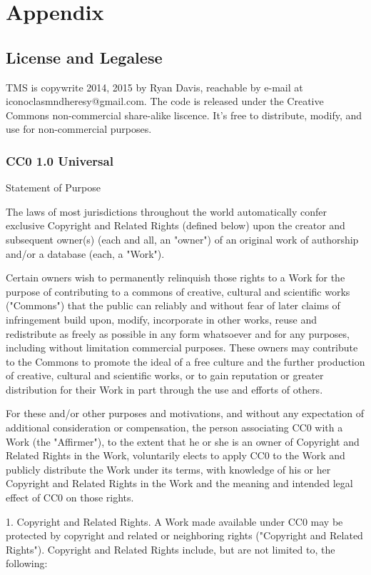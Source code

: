 \documentclass[10pt,letterpaper,twoside]{book}
\begin{document}
\part{Appendix}
\chapter{License and Legalese}
TMS is copywrite 2014, 2015 by Ryan Davis, reachable by e-mail at iconoclasmndheresy@gmail.com.
The code is released under the Creative Commons non-commercial share-alike liscence. It's free to distribute, modify, and use for non-commercial purposes.


\section{CC0 1.0 Universal}

Statement of Purpose

The laws of most jurisdictions throughout the world automatically confer
exclusive Copyright and Related Rights (defined below) upon the creator and
subsequent owner(s) (each and all, an "owner") of an original work of
authorship and/or a database (each, a "Work").

Certain owners wish to permanently relinquish those rights to a Work for the
purpose of contributing to a commons of creative, cultural and scientific
works ("Commons") that the public can reliably and without fear of later
claims of infringement build upon, modify, incorporate in other works, reuse
and redistribute as freely as possible in any form whatsoever and for any
purposes, including without limitation commercial purposes. These owners may
contribute to the Commons to promote the ideal of a free culture and the
further production of creative, cultural and scientific works, or to gain
reputation or greater distribution for their Work in part through the use and
efforts of others.

For these and/or other purposes and motivations, and without any expectation
of additional consideration or compensation, the person associating CC0 with a
Work (the "Affirmer"), to the extent that he or she is an owner of Copyright
and Related Rights in the Work, voluntarily elects to apply CC0 to the Work
and publicly distribute the Work under its terms, with knowledge of his or her
Copyright and Related Rights in the Work and the meaning and intended legal
effect of CC0 on those rights.

1. Copyright and Related Rights. A Work made available under CC0 may be
protected by copyright and related or neighboring rights ("Copyright and
Related Rights"). Copyright and Related Rights include, but are not limited
to, the following:
\end{document}

